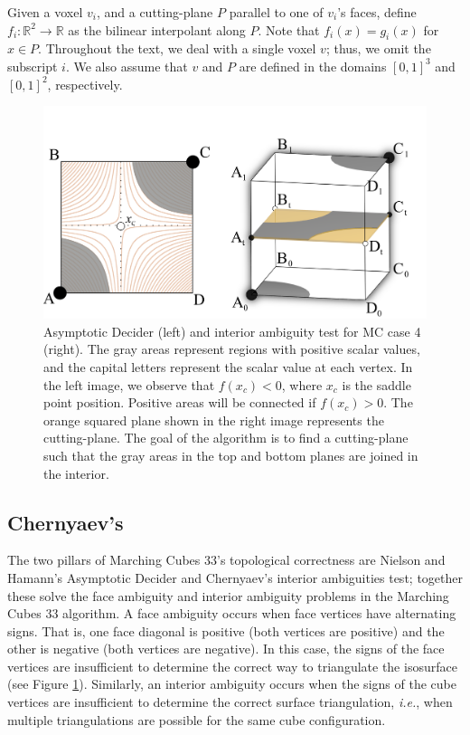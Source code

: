 Given a voxel $v_i$, and a cutting-plane $P$ parallel to one of $v_i$'s faces, define  $f_i:\mathbb{R}^2 \rightarrow \mathbb{R}$ as the bilinear interpolant along $P$. Note that $f_i(x) = g_i(x)$ for $x \in P$. Throughout the text, we deal with a single voxel $v$; thus, we omit the subscript $i$. We also assume that $v$ and $P$ are defined in the domains  $[0,1]^3$ and $[0,1]^2$, respectively.

\begin{figure}[b]
     \centering
     \includegraphics[width=0.6\linewidth]{chapter4/figures/cut-plane-fig.png}
     \caption{Asymptotic Decider (left) and \mc{} interior ambiguity test for MC case 4 (right). The gray areas represent regions with positive scalar values, and the capital letters represent the scalar value at each vertex. In the left image, we observe that $f(x_c) < 0$, where $x_c$ is the saddle point position. Positive areas will be connected if $f(x_c) > 0$. The orange squared plane shown in the right image represents the cutting-plane. The goal of the \mc{} algorithm is to find a cutting-plane such that the gray areas in the top and bottom planes are joined in the interior.}
     \label{interior_ambiguity}
\end{figure}

\subsection{Chernyaev's \mc{}}

The two pillars of Marching Cubes 33's topological correctness are Nielson and Hamann's Asymptotic Decider and Chernyaev's interior ambiguities test; together these solve the face ambiguity and interior ambiguity problems in the Marching Cubes 33 algorithm.
%
%
%
A face ambiguity occurs when face vertices have alternating signs. That is, one face diagonal is positive (both vertices are positive) and the other is negative (both vertices are negative). In this case, the signs of the face vertices are insufficient to determine the correct way to triangulate the isosurface (see Figure \ref{interior_ambiguity}). Similarly, an interior ambiguity occurs when the signs of the cube vertices are insufficient to determine the correct surface triangulation, \emph{i.e.}, when multiple triangulations are possible for the same cube configuration.

